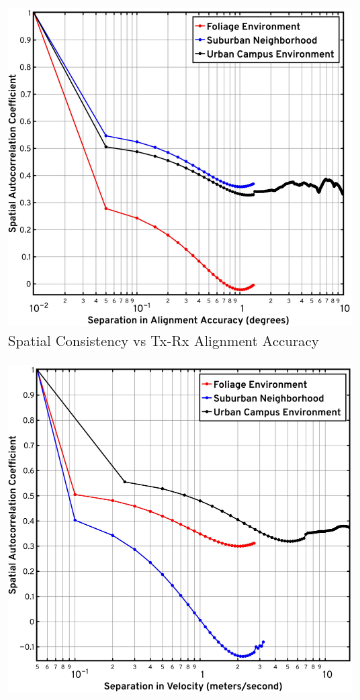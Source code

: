 \documentclass[12pt, draftcls, onecolumn]{IEEEtran}
\begin{document}
{\begin{figure} [t]
    \begin{subfigure}{0.5015\linewidth}
        \centering
        \includegraphics[width=1.0\linewidth]{figs/spatial_consistency_vs_alignment.pdf}
        \caption{Spatial Consistency vs Tx-Rx Alignment Accuracy}
        \label{F8a}
    \end{subfigure}
    \begin{subfigure}{0.4885\linewidth}
        \centering
        \includegraphics[width=1.0\linewidth]{figs/spatial_consistency_vs_velocity.pdf}

\end{subfigure}
\end{figure}}
\end{document}
